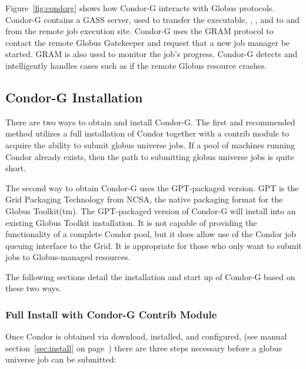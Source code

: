Figure~\ref{fig:condorg} shows how Condor-G interacts with Globus protocols.
Condor-G contains a GASS server, used to transfer the executable,
, , and  to and from
the remote job execution site.
Condor-G uses the GRAM protocol to contact the remote Globus Gatekeeper
and request that a new job manager be started.
GRAM is also used to monitor the job's progress.
Condor-G detects and intelligently handles cases
such as if the remote Globus resource crashes.

\subsection{\label{sec:Condor-G-Install}Condor-G Installation}
There are two ways to obtain and install Condor-G.
The first and recommended method utilizes a full installation
of Condor together with a contrib module to acquire the
ability to submit globus universe jobs.
If a pool of machines running Condor \VersionNotice
already exists,
then the path to submitting globus universe jobs is quite short.

The second way to obtain Condor-G uses the GPT-packaged version.
GPT is the Grid Packaging Technology from NCSA,
the native packaging format for the Globus Toolkit(tm).
The GPT-packaged version of Condor-G will install
into an existing Globus Toolkit installation.
It is not capable of providing the functionality of a complete Condor pool,
but it does allow use of the Condor job queuing interface to the Grid.
It is appropriate for those who only want to submit jobs to
Globus-managed resources.

The following sections detail the installation and start up
of Condor-G based on these two ways.

\subsubsection{\label{sec:Condor-G-FullInstall}Full Install with Condor-G Contrib Module}
Once Condor is obtained via download, installed, and configured,
(see manual
section~\ref{sec:install} on page~\pageref{sec:install})
there are three steps necessary before a globus universe job
can be submitted:

